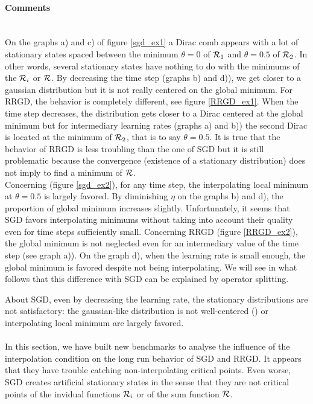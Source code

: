 \paragraph{Comments}
~~\\
On the graphs a) and c) of figure \ref{sgd_ex1} a Dirac comb appears with a lot of stationary states spaced between the minimum $\theta=0$ of $\mathcal{R}_1$ and $\theta=0.5$ of $\mathcal{R}_2$. In
other words, several stationary states have nothing to do with the minimums of the $\mathcal{R}_i$ or $\mathcal{R}$. By decreasing the time step (graphs b) and d)), we get closer to a gaussian
distribution but it is not really centered on the global minimum. For RRGD, the behavior is completely different, see figure \ref{RRGD_ex1}. When the time step decreases, the distribution gets closer to a Dirac centered at the global minimum but for intermediary learning rates (graphs a) and b)) the second Dirac is located at the minimum of $\mathcal{R}_2$, that is to say $\theta=0.5$. It is true that the behavior of RRGD is less troubling than the one of SGD but it is still problematic because the convergence (existence of a stationary distribution) does not imply to find a minimum of $\mathcal{R}$. \\
Concerning \exTwo (figure \ref{sgd_ex2}), for any time step, the interpolating local minimum at $\theta=0.5$ is largely favored. By diminishing $\eta$ on the graphs b) and d), the proportion of global minimum increases slightly. Unfortunately, it seems that SGD favors interpolating minimums without taking into account their quality even for time steps sufficiently small. Concerning RRGD (figure \ref{RRGD_ex2}), the global minimum is not neglected even for an intermediary value of the time step (see graph a)). On the graph d), when the learning rate is small enough, the global minimum is favored despite not being interpolating. We will see in what follows that this difference with SGD can be explained by operator splitting. 

About SGD, even by decreasing the learning rate, the stationary distributions are not satisfactory: the gaussian-like distribution is not well-centered (\exOne) or interpolating
local minimum are largely favored.

\paragraph{}
In this section, we have built new benchmarks to analyse the influence of the interpolation condition on the long run behavior of SGD and RRGD. It appears that they have trouble catching non-interpolating critical points. Even worse, SGD creates artificial stationary states in the sense that they are not critical points of the invidual functions $\mathcal{R}_i$ or of the sum function $\mathcal{R}$.   

